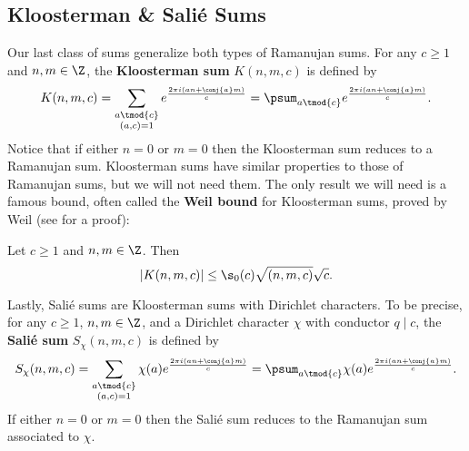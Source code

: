     \subsection*{Kloosterman \& Sali\'e Sums}
      Our last class of sums generalize both types of Ramanujan sums. For any $c \ge 1$ and $n,m \in \Z$, the \textbf{Kloosterman sum} $K(n,m,c)$ is defined by
      \[
        K(n,m,c) = \sum_{\substack{a \tmod{c} \\ (a,c) = 1}}e^{\frac{2\pi i(an+\conj{a}m)}{c}} = \psum_{a \tmod{c}}e^{\frac{2\pi i(an+\conj{a}m)}{c}}.
      \]
      Notice that if either $n = 0$ or $m = 0$ then the Kloosterman sum reduces to a Ramanujan sum. Kloosterman sums have similar properties to those of Ramanujan sums, but we will not need them. The only result we will need is a famous bound, often called the \textbf{Weil bound} for Kloosterman sums, proved by Weil (see \cite{weil1948some} for a proof):

      \begin{theorem}
        Let $c \ge 1$ and $n,m \in \Z$. Then
        \[
          |K(n,m,c)| \le \s_{0}(c)\sqrt{(n,m,c)}\sqrt{c}.
        \]
      \end{theorem}

      Lastly, Sali\'e sums are Kloosterman sums with Dirichlet characters. To be precise, for any $c \ge 1$, $n,m \in \Z$, and a Dirichlet character $\chi$ with conductor $q \mid c$, the \textbf{Sali\'e sum} $S_{\chi}(n,m,c)$ is defined by
      \[
        S_{\chi}(n,m,c) = \sum_{\substack{a \tmod{c} \\ (a,c) = 1}}\chi(a)e^{\frac{2\pi i(an+\conj{a}m)}{c}} = \psum_{a \tmod{c}}\chi(a)e^{\frac{2\pi i(an+\conj{a}m)}{c}}.
      \]
      If either $n = 0$ or $m = 0$ then the Sali\'e sum reduces to the Ramanujan sum associated to $\chi$.

